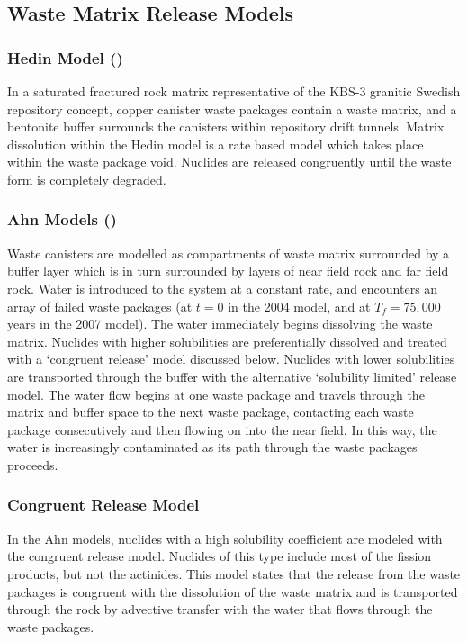 
\subsection{Waste Matrix Release Models}

\subsubsection{Hedin Model (\cite{hedin_integrated_2002})}

In a saturated fractured rock matrix representative of the KBS-3 
granitic Swedish repository concept, copper canister waste packages 
contain a waste matrix, and a bentonite buffer surrounds the canisters 
within repository drift tunnels. Matrix dissolution within the Hedin 
model is a rate based model which takes place within the waste package 
void. Nuclides are released congruently until the waste form is 
completely degraded. 

\subsubsection{Ahn Models (\cite{ahn_environmental_2004, 
ahn_environmental_2007})}

Waste canisters are modelled as compartments of waste matrix 
surrounded by a buffer layer which is in turn surrounded by layers of 
near field rock and far field rock. Water is introduced to the system 
at a constant rate, and encounters an array of failed waste packages 
(at $t=0$ in the 2004 model, and at $T_f=75,000$ years in the 2007 
model). The water immediately begins dissolving the waste matrix.  
Nuclides with higher solubilities are preferentially dissolved and 
treated with a `congruent release' model discussed below. Nuclides 
with lower solubilities are transported through the buffer with the 
alternative `solubility limited' release model. The water flow begins 
at one waste package and travels through the matrix and buffer space 
to the next waste package, contacting each waste package consecutively 
and then flowing on into the near field. In this way, the water is 
increasingly contaminated as its path through the waste packages 
proceeds.  

\subsubsection{Congruent Release Model} 

In the Ahn models, nuclides with a high solubility coefficient are 
modeled with the congruent release model.  Nuclides of this type 
include most of the fission products, but not the actinides. This 
model states that the release from the waste packages is congruent 
with the dissolution of the waste matrix and is transported through 
the rock by advective transfer with the water that flows through the 
waste packages.  

